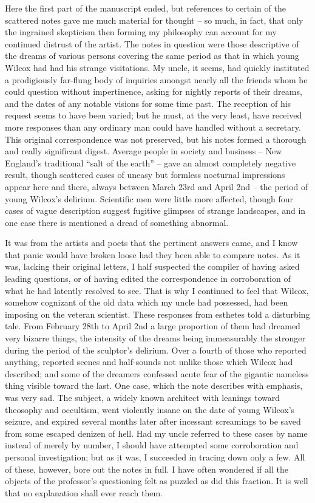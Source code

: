 Here the first part of the manuscript ended, but references to certain of the scattered notes gave me much material for thought⁠ – so much, in fact, that only the ingrained skepticism then forming my philosophy can account for my continued distrust of the artist. The notes in question were those descriptive of the dreams of various persons covering the same period as that in which young Wilcox had had his strange visitations. My uncle, it seems, had quickly instituted a prodigiously far-flung body of inquiries amongst nearly all the friends whom he could question without impertinence, asking for nightly reports of their dreams, and the dates of any notable visions for some time past. The reception of his request seems to have been varied; but he must, at the very least, have received more responses than any ordinary man could have handled without a secretary. This original correspondence was not preserved, but his notes formed a thorough and really significant digest. Average people in society and business⁠ – New England’s traditional “salt of the earth”⁠ – gave an almost completely negative result, though scattered cases of uneasy but formless nocturnal impressions appear here and there, always between March 23rd and April 2nd⁠ – the period of young Wilcox’s delirium. Scientific men were little more affected, though four cases of vague description suggest fugitive glimpses of strange landscapes, and in one case there is mentioned a dread of something abnormal.

It was from the artists and poets that the pertinent answers came, and I know that panic would have broken loose had they been able to compare notes. As it was, lacking their original letters, I half suspected the compiler of having asked leading questions, or of having edited the correspondence in corroboration of what he had latently resolved to see. That is why I continued to feel that Wilcox, somehow cognizant of the old data which my uncle had possessed, had been imposing on the veteran scientist. These responses from esthetes told a disturbing tale. From February 28th to April 2nd a large proportion of them had dreamed very bizarre things, the intensity of the dreams being immeasurably the stronger during the period of the sculptor’s delirium. Over a fourth of those who reported anything, reported scenes and half-sounds not unlike those which Wilcox had described; and some of the dreamers confessed acute fear of the gigantic nameless thing visible toward the last. One case, which the note describes with emphasis, was very sad. The subject, a widely known architect with leanings toward theosophy and occultism, went violently insane on the date of young Wilcox’s seizure, and expired several months later after incessant screamings to be saved from some escaped denizen of hell. Had my uncle referred to these cases by name instead of merely by number, I should have attempted some corroboration and personal investigation; but as it was, I succeeded in tracing down only a few. All of these, however, bore out the notes in full. I have often wondered if all the objects of the professor’s questioning felt as puzzled as did this fraction. It is well that no explanation shall ever reach them.

